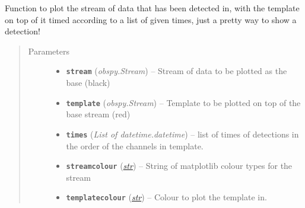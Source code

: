 \documentclass[a4paper,10pt,english]{sphinxmanual}
\begin{document}
\begin{fulllineitems}
\label{submodules/utils.EQcorrscan_plotting:EQcorrscan_plotting.detection_multiplot}
Function to plot the stream of data that has been detected in, with the
template on top of it timed according to a list of given times, just a
pretty way to show a detection!
\begin{quote}\begin{description}
\item[{Parameters}] \leavevmode\begin{itemize}
\item {} 
\textbf{\texttt{stream}} (\emph{obspy.Stream}) -- Stream of data to be plotted as the base (black)

\item {} 
\textbf{\texttt{template}} (\emph{obspy.Stream}) -- Template to be plotted on top of the base stream (red)

\item {} 
\textbf{\texttt{times}} (\emph{List of datetime.datetime}) -- list of times of detections in the order of the channels in
template.

\item {} 
\textbf{\texttt{streamcolour}} (\href{https://docs.python.org/library/functions.html\#str}{\emph{str}}) -- String of matplotlib colour types for the stream

\item {} 
\textbf{\texttt{templatecolour}} (\href{https://docs.python.org/library/functions.html\#str}{\emph{str}}) -- Colour to plot the template in.

\end{itemize}

\end{description}\end{quote}

\end{fulllineitems}

\end{document}
